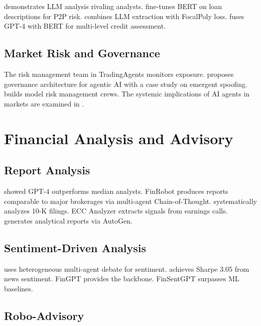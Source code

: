 \documentclass[12pt]{report}
\begin{document}
\citet{kim2024financial} demonstrates LLM analysis rivaling analysts. \citet{sanzguerrero2025credit} fine-tunes BERT on loan descriptions for P2P risk. \citet{xia2025creditscoring} combines LLM extraction with FocalPoly loss. \citet{tan2025gpt4credit} fuses GPT-4 with BERT for multi-level credit assessment.

\subsection{Market Risk and Governance}

The risk management team in TradingAgents \citep{xiao2024tradingagents} monitors exposure. \citet{kurshan2025agenticregulator} proposes governance architecture for agentic AI with a case study on emergent spoofing. \citet{okpala2025agenticfinancial} builds model risk management crews. The systemic implications of AI agents in markets are examined in \citet{aiagentsmarkets2026}.

\section{Financial Analysis and Advisory}

\subsection{Report Analysis}

\citet{kim2024financial} showed GPT-4 outperforms median analysts. FinRobot \citep{zhou2024finrobotequity} produces reports comparable to major brokerages via multi-agent Chain-of-Thought. \citet{daimi2024sec10k} systematically analyzes 10-K filings. ECC Analyzer \citep{ecc2024analyzer} extracts signals from earnings calls. \citet{earningscalls2024} generates analytical reports via AutoGen.

\subsection{Sentiment-Driven Analysis}

\citet{xing2025heterogeneous} uses heterogeneous multi-agent debate for sentiment. \citet{kirtac2024sentiment} achieves Sharpe 3.05 from news sentiment. FinGPT \citep{yang2023fingpt} provides the backbone. FinSentGPT \citep{finsentgpt2024} surpasses ML baselines.

\subsection{Robo-Advisory}
\end{document}
